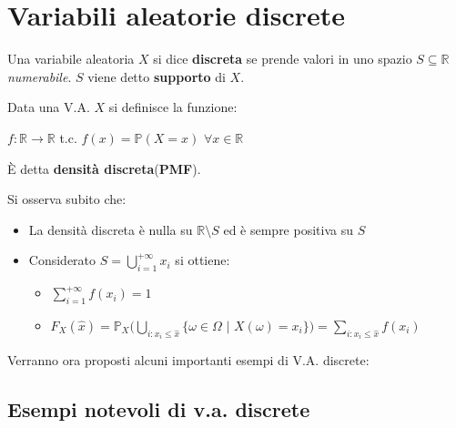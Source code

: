 \section{Variabili aleatorie discrete}

\begin{definition}
Una variabile aleatoria $X$ si dice \textbf{discreta} se prende valori in uno spazio $S\subseteq\mathbb{R}$ \textit{numerabile}. $S$ viene detto \textbf{supporto} di $X$.
\end{definition}

\begin{definition}
Data una V.A. $X$ si definisce la funzione:
\begin{center}
    $f:\mathbb{R}\longrightarrow\mathbb{R}$ t.c. $f(x)=\mathbb{P}(X=x)$  $\forall x\in\mathbb{R}$
\end{center}
È detta \textbf{densità discreta}(\textbf{PMF}).
\end{definition}

\vspace{10px}

\begin{observation}
Si osserva subito che:
\begin{itemize}
    \item La densità discreta è nulla su $\mathbb{R}\setminus S$ ed è sempre positiva su $S$
    \item Considerato $S=\bigcup\limits_{i=1}^{+\infty}x_i$ si ottiene:
    \begin{itemize}
        \item $\sum\limits_{i=1}^{+\infty}f(x_i)=1$
        \item $F_X(\hat{x})=\mathbb{P}_X(\bigcup\limits_{i:x_i\leq\hat{x}}\{\omega\in\Omega$ $|$ $X(\omega)=x_i\})=\sum\limits_{i:x_i\leq\hat{x}}f(x_i)$
    \end{itemize}
\end{itemize}
\end{observation}

\vspace{10px}

Verranno ora proposti alcuni importanti esempi di V.A. discrete:

\vspace{10px}

\subsection{Esempi notevoli di v.a. discrete}

